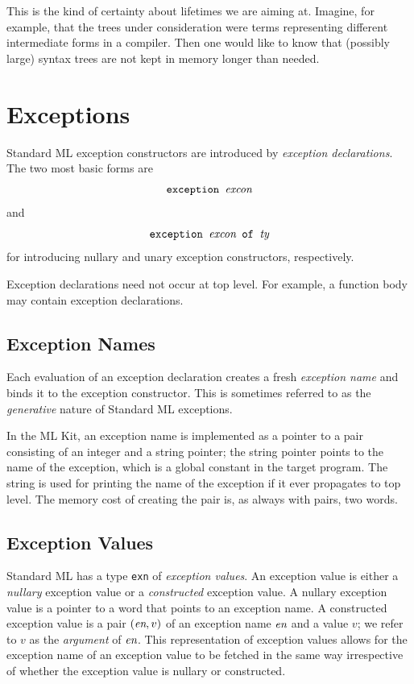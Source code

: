 \documentclass[12pt]{book}
\begin{document}
This is the kind of certainty about lifetimes we are aiming at.
Imagine, for example, that the trees under consideration were terms
representing different intermediate forms in a compiler. Then one
would like to know that (possibly large) syntax trees are not kept in
memory longer than needed.

\chapter{Exceptions}
\label{exceptions.sec}

Standard ML
%
%
exception constructors are introduced by
%
% 
{\em exception declarations}. The two most basic forms are
$$\hbox{\tt exception {\it excon}}$$
and 
$$\hbox{\tt exception {\it excon} of {\it ty}}$$
for introducing nullary
and unary exception constructors, respectively.

Exception declarations need not occur at top level. For example, a
function body may contain exception declarations. 

\section{Exception Names}
Each evaluation of an exception declaration creates a fresh
%
%
{\em exception name\/} and binds it to the exception constructor. This
is sometimes referred to as the {\em generative\/} nature of Standard
ML exceptions.

In the ML Kit, an exception name is implemented as a pointer to a pair
consisting of an integer and a string pointer; the string pointer
points to the name of the exception, which is a global constant in the
target program. The string is used for printing the name of the
exception if it ever propagates to top level. The memory cost of
creating the pair is, as always with pairs, two words.

\section{Exception Values}
Standard ML has a type 
%
{\tt exn} of 
%
{\em exception values}.  An exception value is either a
%
{\em nullary\/} exception value or a 
%
{\em constructed\/} exception value. A nullary exception value is a
pointer to a word that points to an exception name. A constructed
exception value is a pair $(\hbox{\it en},v)$ of an exception name $\hbox{\it en}$
and a value $v$; we refer to $v$ as the {\em argument\/} of $\hbox{\it en}$.
This representation of exception values allows for the exception name
of an exception value to be fetched in the same way irrespective of
whether the exception value is nullary or constructed.
\end{document}
